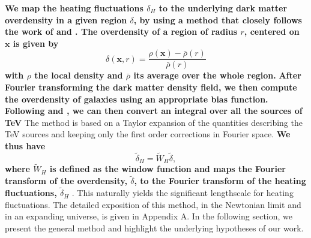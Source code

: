 \documentclass[twocolumns]{emulateapj}
\newcommand\ALc[1]{{\color{red} \bf #1}} %
\newcommand\Pc[1]{{\color{cyan} \bf #1}} %
\begin{document}
\ALc{We map the heating fluctuations $\delta_H$ to the underlying dark matter overdensity in a given region $\delta$, by using a method that closely follows the work of  \citet{2007MNRAS.376.1680P} and \citet{2005ApJ...626....1B}. The overdensity of a region of radius $r$, centered on $\mathbf{x}$ is given by
\begin{equation}
  \label{eq:delta}
  \delta(\mathbf{x},r)=\frac{\rho(\mathbf{x})-\bar{\rho}(r)}{\bar{\rho}(r)}
\end{equation}
with $\rho$ the local density and $\bar{\rho}$ its average over the whole region.} \Pc{After Fourier transforming the dark matter density field, we then compute the overdensity of galaxies using an appropriate bias function.  Following \citet{2007MNRAS.376.1680P} and \citet{2005ApJ...626....1B}, we can then convert an integral over all the sources of TeV} The method is based on a Taylor expansion of the quantities describing the TeV sources and keeping only the first order corrections in Fourier space.  \ALc{We thus have}
\begin{equation}
  \label{eq:use_window}
  \tilde{\delta}_H=\tilde{W}_H\tilde{\delta},
\end{equation}
\Pc{where $\tilde{W}_H$ is defined as the window function and maps the Fourier transform of the overdensity, $\tilde{\delta}$, to the Fourier transform of the heating fluctuations, $\tilde{\delta}_H$ }. This naturally yields the significant lengthscale for heating fluctuations. %
The detailed exposition of this method, in the Newtonian limit and in an expanding universe, is given in Appendix A. In the following section, we present the general method and highlight the underlying hypotheses of our work.
\end{document}
